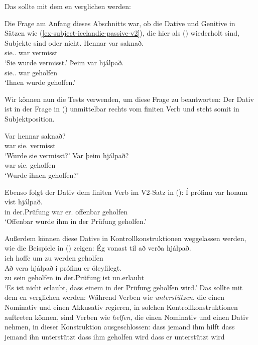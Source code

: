 \noindent
Das sollte mit dem en verglichen werden:
\eal
{}
\zl

\noindent
Die Frage am Anfang dieses Abschnitts war, ob die Dative und Genitive in Sätzen
wie (\ref{ex-subject-icelandic-passive-v2}), die hier als () wiederholt sind, Subjekte sind oder nicht.
\eal
\ex 
\gll Hennar     var saknað.\\
     sie.\SG.\GEN{} war vermisst\\\icelandic
\glt `Sie wurde vermisst.'
\ex 
\gll Þeim        var hjálpað.\\
     sie.\PL.\DAT{} war geholfen\\
\glt `Ihnen wurde geholfen.'
\zl

\noindent
Wir können nun die Tests verwenden, um diese Frage zu beantworten: Der Dativ ist in der Frage in () unmittelbar rechts vom finiten
Verb und steht somit in Subjektposition.

\eal
\ex 
\gll Var hennar saknað?\\
     war sie.\GEN{} vermisst\\\icelandic
\glt `Wurde sie vermisst?'
\ex
\gll Var þeim       hjálpað?\\
     war sie.\DAT{} geholfen\\
\glt `Wurde ihnen geholfen?'
\zl


\noindent
Ebenso folgt der Dativ dem finiten Verb im V2-Satz in ():
\ea
\gll Í prófinu  var honum víst hjálpað.\\
     in der.Prüfung war er.\DAT{} offenbar geholfen\\\icelandic
\glt `Offenbar wurde ihm in der Prüfung geholfen.'
\z

\noindent
Außerdem können diese Dative in Kontrollkonstruktionen weggelassen werden, wie die Beispiele in () zeigen:
\eal
\ex
\gll Ég vonast til að verða hjálpað.\\
     ich hoffe um zu werden geholfen\\\icelandic
\ex
\gll Að vera hjálpað i prófinu er óleyfilegt.\\
     zu sein geholfen in der.Prüfung ist un.erlaubt\\
\glt `Es ist nicht erlaubt, dass einem in der Prüfung geholfen wird.'
\zl
Das sollte mit dem en verglichen werden: Während Verben wie \emph{unterstützen}, die einen
Nominativ und einen Akkusativ regieren, in solchen Kontrollkonstruktionen auftreten können, sind Verben wie \emph{helfen}, die einen Nominativ und einen Dativ nehmen, in dieser Konstruktion ausgeschlossen:
\eal
\ex 
dass jemand ihm hilft
\ex
dass jemand ihn unterstützt
\ex
dass ihm geholfen wird
\ex
dass er unterstützt wird
\zl


